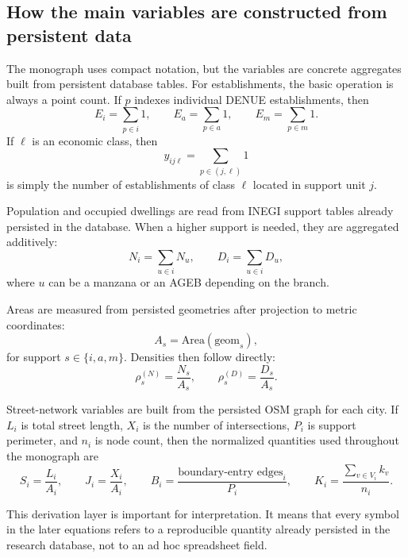 \documentclass[11pt]{article}
\begin{document}
\subsection{How the main variables are constructed from persistent data}

The monograph uses compact notation, but the variables are concrete aggregates built from persistent database tables. For establishments, the basic operation is always a point count. If \(p\) indexes individual DENUE establishments, then
\begin{equation}
E_i = \sum_{p \in i} 1,
\qquad
E_a = \sum_{p \in a} 1,
\qquad
E_m = \sum_{p \in m} 1.
\end{equation}
If \(\ell\) is an economic class, then
\begin{equation}
y_{ij\ell} = \sum_{p \in (j,\ell)} 1
\end{equation}
is simply the number of establishments of class \(\ell\) located in support unit \(j\).

Population and occupied dwellings are read from INEGI support tables already persisted in the database. When a higher support is needed, they are aggregated additively:
\begin{equation}
N_i = \sum_{u \in i} N_u,
\qquad
D_i = \sum_{u \in i} D_u,
\end{equation}
where \(u\) can be a manzana or an AGEB depending on the branch.

Areas are measured from persisted geometries after projection to metric coordinates:
\begin{equation}
A_s = \mathrm{Area}(\mathrm{geom}_s),
\end{equation}
for support \(s\in\{i,a,m\}\). Densities then follow directly:
\begin{equation}
\rho_s^{(N)} = \frac{N_s}{A_s},
\qquad
\rho_s^{(D)} = \frac{D_s}{A_s}.
\end{equation}

Street-network variables are built from the persisted OSM graph for each city. If \(L_i\) is total street length, \(X_i\) is the number of intersections, \(P_i\) is support perimeter, and \(n_i\) is node count, then the normalized quantities used throughout the monograph are
\begin{equation}
S_i = \frac{L_i}{A_i},
\qquad
J_i = \frac{X_i}{A_i},
\qquad
B_i = \frac{\text{boundary-entry edges}_i}{P_i},
\qquad
K_i = \frac{\sum_{v\in V_i}k_v}{n_i}.
\end{equation}

This derivation layer is important for interpretation. It means that every symbol in the later equations refers to a reproducible quantity already persisted in the research database, not to an ad hoc spreadsheet field.
\end{document}
